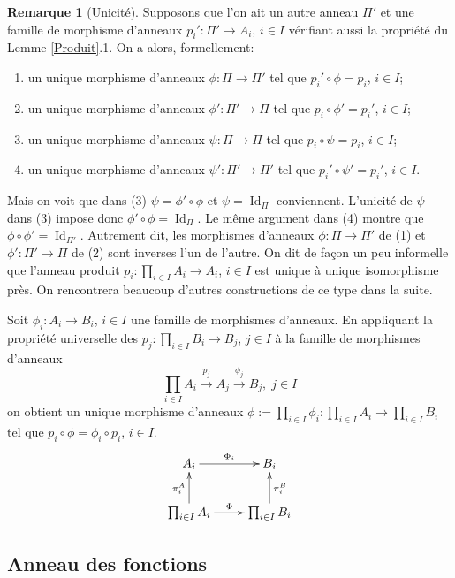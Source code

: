 \documentclass[a4paper, oneside, 12pt]{book}
\theoremstyle{theoremeStyle} %
\theoremstyle{definition} %
\newtheorem{remarque}[theoreme]{Remarque}
\DeclareMathOperator{\Id}{Id}
\begin{document}
	\begin{remarque}[Unicité]Supposons que l'on ait un autre anneau  $\Pi'$ et une famille de morphisme d'anneaux $p_i':\Pi'\rightarrow A_i$, $i\in I$ vérifiant aussi la propriété du Lemme \ref{Produit}.1. On a alors, formellement:
\begin{enumerate}[leftmargin=* ,parsep=0cm,itemsep=0cm,topsep=0cm]
\item un unique morphisme d'anneaux $\phi:\Pi\rightarrow \Pi'$ tel que $p_i'\circ \phi=p_i$, $i\in I$;
\item un unique morphisme d'anneaux $\phi':\Pi'\rightarrow \Pi$ tel que $p_i\circ \phi'=p_i'$, $i\in I$;
\item un unique morphisme d'anneaux $\psi:\Pi\rightarrow \Pi$ tel que $p_i\circ \psi=p_i$, $i\in I$;
\item un unique morphisme d'anneaux $\psi':\Pi'\rightarrow \Pi'$ tel que $p_i'\circ \psi'=p_i'$, $i\in I$.
\end{enumerate}
		Mais on voit que dans (3) $\psi=\phi'\circ \phi$ et $\psi=\Id_\Pi$ conviennent. L'unicité de $\psi$ dans (3) impose donc $\phi'\circ \phi=\Id_\Pi$. Le même argument dans (4) montre que $\phi\circ \phi'=\Id_{\Pi'}$. Autrement dit, les morphismes d'anneaux $\phi:\Pi\rightarrow \Pi'$ de (1) et $\phi':\Pi'\rightarrow \Pi$ de (2) sont inverses l'un de l'autre. On dit de façon un peu informelle que l'anneau produit  $p_i:\prod_{i\in I}A_i\rightarrow A_i$, $i\in I$ est unique à unique isomorphisme près. On rencontrera beaucoup d'autres constructions de ce type dans la suite.\end{remarque}

   Soit $\phi_i:A_i\rightarrow B_i$, $i\in I$ une famille de morphismes d'anneaux. En appliquant la propriété universelle des $p_j:\prod_{i\in I}B_i\rightarrow B_j$, $j\in I$ à la famille de morphismes d'anneaux
$$ \prod_{i\in I}A_i\stackrel{p_j}{\rightarrow}A_j\stackrel{\phi_j}{\rightarrow} B_j,\; j\in I$$
on obtient un unique morphisme d'anneaux $\phi:=\prod_{i\in I}\phi_i:\prod_{i\in I}A_i\rightarrow \prod_{i\in I} B_i$ tel que $p_i\circ \phi=\phi_i\circ p_i$, $i\in I$. \\

	$$ \xymatrix{ A_i \ar[r]^{\Phi_i} & B_i \\ \prod_{i\in I} A_i \ar[u]^{\pi^A_i} \ar[r]^\Phi & \prod_{i\in I}B_i \ar[u]_{\pi^B_i} } $$

		\subsection{Anneau des fonctions}
\end{document}
